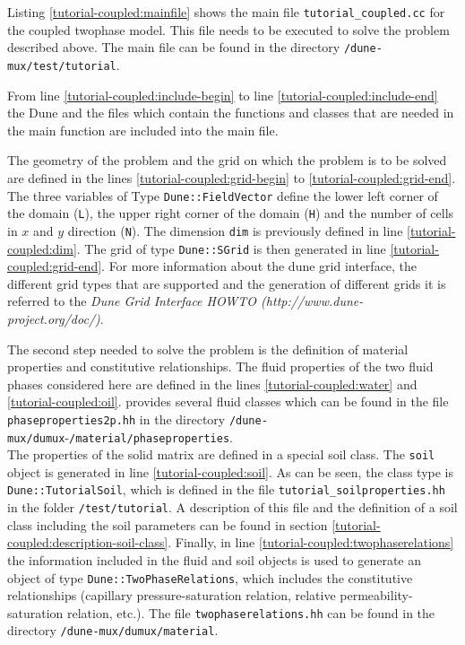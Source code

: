 Listing \ref{tutorial-coupled:mainfile} shows the main file \texttt{tutorial\_coupled.cc} for the coupled twophase model. This file needs to be executed to solve the problem described above. The main file can be found in the directory \texttt{/dune-mux/test/tutorial}.

\begin{lst}\label{tutorial-coupled:mainfile} \mbox{}

\end{lst}

From line \ref{tutorial-coupled:include-begin} to line \ref{tutorial-coupled:include-end} the Dune and the \Dumux files which contain the functions and classes that are needed in the main function are included into the main file.

The geometry of the problem and the grid on which the problem is to be solved are defined in the lines \ref{tutorial-coupled:grid-begin} to \ref{tutorial-coupled:grid-end}. The three variables of Type \texttt{Dune::FieldVector} define the lower left corner of the domain (\texttt{L}), the upper right corner of the domain (\texttt{H}) and the number of cells in $x$ and $y$ direction (\texttt{N}). The dimension \texttt{dim} is previously defined in line \ref{tutorial-coupled:dim}. The grid of type \texttt{Dune::SGrid} is then generated in line \ref{tutorial-coupled:grid-end}. For more information about the dune grid interface, the different grid types that are supported and the generation of different grids it is referred to the \textit{Dune Grid Interface HOWTO (http://www.dune-project.org/doc/)}.

The second step needed to solve the problem is the definition of material properties and constitutive relationships. The fluid properties of the two fluid phases considered here are defined in the lines \ref{tutorial-coupled:water} and \ref{tutorial-coupled:oil}. \Dumux provides several fluid classes which can be found in the file \texttt{phaseproperties2p.hh} in the directory \texttt{/dune-mux/dumux}-\texttt{/material/phaseproperties}. \\
The properties of the solid matrix are defined in a special soil class. The \texttt{soil} object is generated in line \ref{tutorial-coupled:soil}. As can be seen, the class type is \texttt{Dune::TutorialSoil}, which is defined in the file \texttt{tutorial\_soilproperties.hh} in the folder \texttt{/test/tutorial}. A description of this file and the definition of a soil class including the soil parameters can be found in section \ref{tutorial-coupled:description-soil-class}. Finally, in line \ref{tutorial-coupled:twophaserelations} the information included in the fluid and soil objects is used to generate an object of type \texttt{Dune::TwoPhaseRelations}, which includes the constitutive relationships (capillary pressure-saturation relation, relative permeability-saturation relation, etc.). The file \texttt{twophaserelations.hh} can be found in the directory \texttt{/dune-mux/dumux/material}.

